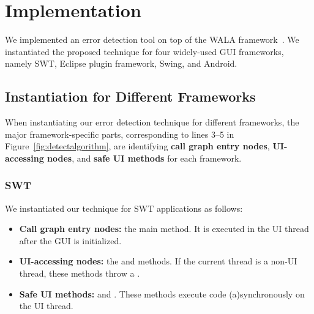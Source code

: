 
\tinystep
\tinystep
\section{Implementation}
\label{sec:implementation}

We implemented an error detection tool on top of the WALA framework~\cite{walatutorial}.
We instantiated the proposed technique for four widely-used
GUI frameworks, namely SWT, Eclipse plugin framework, Swing, and Android.

\tinystep


\subsection{Instantiation for Different Frameworks}
\label{sec:platforms}

When instantiating our error detection technique for different
frameworks, the major framework-specific parts, corresponding to
lines 3--5 in Figure~\ref{fig:detectalgorithm}, are identifying
\textbf{call graph entry nodes}, \textbf{UI-accessing nodes},
and \textbf{safe UI methods} for each framework.

\tinystep
\subsubsection{SWT}

 We instantiated our technique for SWT applications as follows:

\preitemizespace

\begin{itemize}

\item \textbf{Call graph entry nodes:}  the main method. 
It is executed in the UI thread after the GUI
is initialized.

\smallstep

\item \textbf{UI-accessing nodes:}  the 
and  methods.
If the current thread is a non-UI thread, these
methods throw a .


\smallstep

\item \textbf{Safe UI methods:}  
and .
These methods
execute code (a)synchro\-nously on the UI thread.

\end{itemize}

